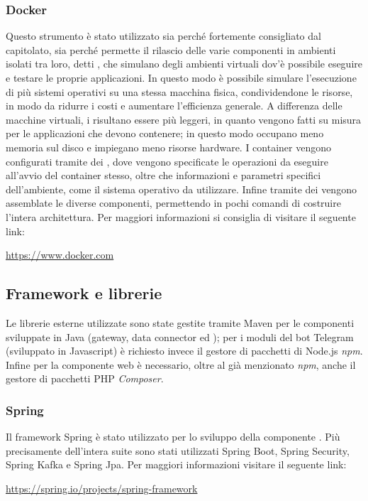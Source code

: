 		\subsubsection{Docker}
			Questo strumento è stato utilizzato sia perché fortemente consigliato dal capitolato, sia perché permette il rilascio delle varie componenti in ambienti isolati tra loro, detti , che simulano degli ambienti virtuali dov'è possibile eseguire e testare le proprie applicazioni.
			\newline
			In questo modo è possibile simulare l'esecuzione di più sistemi operativi su una stessa macchina fisica, condividendone le risorse, in modo da ridurre i costi e aumentare l'efficienza generale.
			\newline
			A differenza delle macchine virtuali, i  risultano essere più leggeri, in quanto vengono fatti su misura per le applicazioni che devono contenere; in questo modo occupano meno memoria sul disco e impiegano meno risorse hardware.
			\newline
			I container vengono configurati tramite dei , dove vengono specificate le operazioni da eseguire all'avvio del container stesso, oltre che informazioni e parametri specifici dell'ambiente, come il sistema operativo  da utilizzare. Infine tramite dei  vengono assemblate le diverse componenti, permettendo in pochi comandi di costruire l'intera architettura.
			\newline
			Per maggiori informazioni si consiglia di visitare il seguente link:
			\newline
			\begin{center}
				\url{https://www.docker.com}
			\end{center}
	\subsection{Framework e librerie}
		Le librerie esterne utilizzate sono state gestite tramite Maven per le componenti sviluppate in Java (gateway, data connector ed ); per i moduli del bot Telegram (sviluppato in Javascript) è richiesto invece il gestore di pacchetti di Node.js \textit{npm}. Infine per la componente web è necessario, oltre al già menzionato \textit{npm}, anche il gestore di pacchetti PHP \textit{Composer}.
		\subsubsection{Spring}
			Il framework Spring è stato utilizzato per lo sviluppo della componente . Più precisamente dell'intera suite sono stati utilizzati Spring Boot, Spring Security, Spring Kafka e Spring Jpa.
			\newline
			Per maggiori informazioni visitare il seguente link:
			\newline
			\begin{center}
				\url{https://spring.io/projects/spring-framework}
			\end{center}

